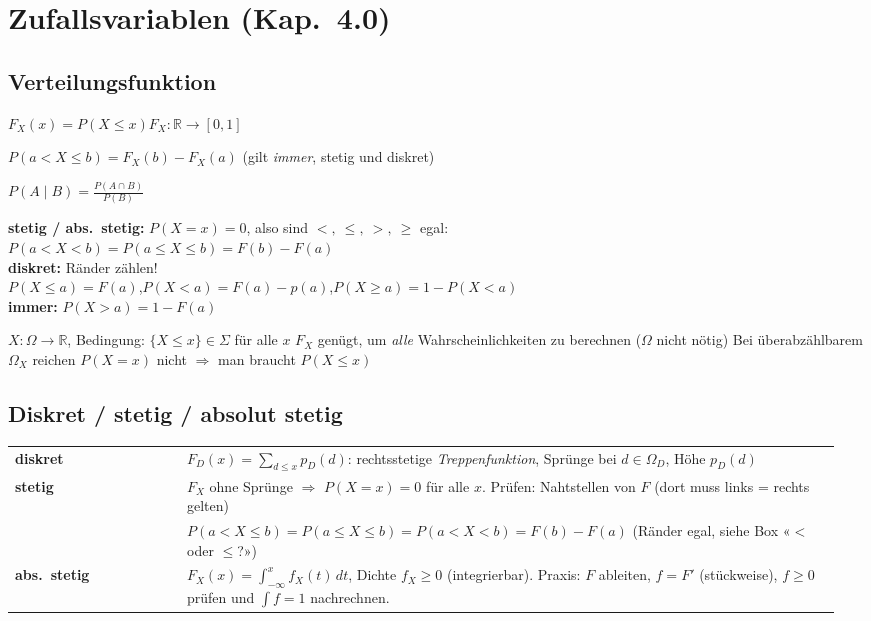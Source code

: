 \section{Zufallsvariablen (Kap.\ 4.0)}
\subsection{Verteilungsfunktion}
\begin{formel}
$F_X(x)=P(X\le x)$\qquad $F_X:\mathbb R\to[0,1]$
\end{formel}
\begin{formel}
$P(a<X\le b)=F_X(b)-F_X(a)$ \quad (gilt \emph{immer}, stetig und diskret)
\end{formel}
\begin{formel}
$P(A \mid B) = \frac{P(A \cap B)}{P(B)}$
\end{formel}

\begin{merke}
\textbf{stetig / abs.\ stetig:} $P(X=x)=0$, also sind $<,\ \le,\ >,\ \ge$ egal:\\
$P(a<X<b)=P(a\le X\le b)=F(b)-F(a)$\\[2pt]
\textbf{diskret:} Ränder zählen!\\
$P(X\le a)=F(a)$,\quad $P(X<a)=F(a)-p(a)$,\quad $P(X\ge a)=1-P(X<a)$\\[2pt]
\textbf{immer:} $P(X>a)=1-F(a)$
\end{merke}

\begin{itemize}
\pfeil $X:\Omega\to\mathbb R$, Bedingung: $\{X\le x\}\in\Sigma$ für alle $x$
\pfeil $F_X$ genügt, um \emph{alle} Wahrscheinlichkeiten zu berechnen ($\Omega$ nicht nötig)
\pfeil Bei überabzählbarem $\Omega_X$ reichen $P(X=x)$ nicht $\Rightarrow$ man braucht $P(X\le x)$
\end{itemize}

\begin{merke}
\end{merke}

\subsection{Diskret / stetig / absolut stetig}
\begin{tabular}{@{}p{0.2\linewidth}p{0.76\linewidth}@{}}
\toprule
\textbf{diskret} & $F_D(x)=\sum_{d\le x}p_D(d)$: rechtsstetige \emph{Treppenfunktion}, Sprünge bei $d\in\Omega_D$, Höhe $p_D(d)$\\
\textbf{stetig} & $F_X$ ohne Sprünge $\Rightarrow$ $P(X=x)=0$ für alle $x$. Prüfen: Nahtstellen von $F$ (dort muss links = rechts gelten)\\
 & $P(a<X\le b)=P(a\le X\le b)=P(a<X<b)=F(b)-F(a)$ (Ränder egal, siehe Box «$<$ oder $\le$?»)\\
\textbf{abs.\ stetig} & $F_X(x)=\int_{-\infty}^x f_X(t)\,dt$, Dichte $f_X \geq 0$ (integrierbar). Praxis: $F$ ableiten, $f = F'$ (stückweise), $f \geq 0$ prüfen und $\int f = 1$ nachrechnen.\\
\bottomrule
\end{tabular}

